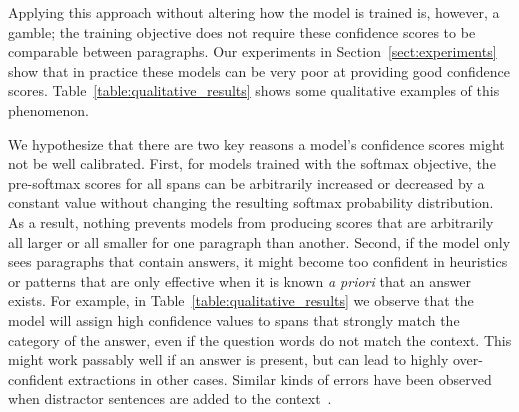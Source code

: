 \documentclass[11pt,a4paper]{article}
\begin{document}
%
Applying this approach without altering how the model is trained is, however, a gamble; the training objective does not require these confidence scores to be comparable between paragraphs. Our experiments in Section~\ref{sect:experiments} show that in practice these models can be very poor at providing good confidence scores. Table~\ref{table:qualitative_results} shows some qualitative examples of this phenomenon.

We hypothesize that there are two key reasons a model's confidence scores might not be well calibrated. First, for models trained with the softmax objective, the pre-softmax scores for all spans can be arbitrarily increased or decreased by a constant value without changing the resulting softmax probability distribution. As a result, nothing prevents models from producing scores that are arbitrarily all larger or all smaller for one paragraph than another. Second, if the model only sees paragraphs that contain answers, it might become too confident in heuristics or patterns that are only effective when it is known \textit{a priori} that an answer exists. For example, in Table~\ref{table:qualitative_results} we observe that the model will assign high confidence values to spans that strongly match the category of the answer, even if the question words do not match the context. 
This might work passably well if an answer is present, but can lead to highly over-confident extractions in other cases.
Similar kinds of errors have been observed when distractor sentences are added to the context~\citep{jia2017adversarial}.
 
\end{document}
